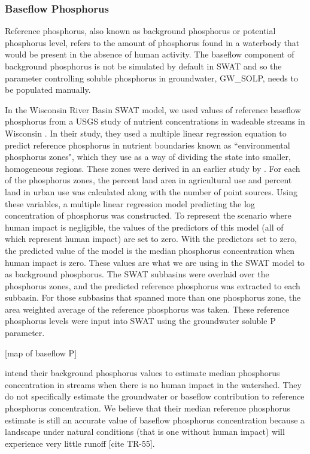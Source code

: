 \subsubsection{Baseflow Phosphorus}
	Reference phosphorus, also known as background phosphorus or potential phosphorus level, refers to the amount of phosphorus found in a waterbody that would be present in the absence of human activity. The baseflow component of background phosphorus is not be simulated by default in SWAT and so the parameter controlling soluble phosphorus in groundwater, GW\_SOLP, needs to be populated manually. 
	
	In the Wisconsin River Basin SWAT model, we used values of reference baseflow phosphorus from a USGS study of nutrient concentrations in wadeable streams in Wisconsin \citet{robertson_wadeable_2006}. In their study, they used a multiple linear regression equation to predict reference phosphorus in nutrient boundaries known as ``environmental phosphorus zones", which they use as a way of dividing the state into smaller, homogeneous regions. These zones were derived in an earlier study by \citet{robertson_phosphoruszones_2006}. 
	For each of the phosphorus zones, the percent land area in agricultural use and percent land in urban use was calculated along with the number of point sources. Using these variables, a multiple linear regression model predicting the log concentration of phosphorus was constructed. To represent the scenario where human impact is negligible, the values of the predictors of this model (all of which represent human impact) are set to zero. With the predictors set to zero, the predicted value of the model is the median phosphorus concentration when human impact is zero.	These values are what we are using in the SWAT model to as background phosphorus. The SWAT subbasins were overlaid over the phosphorus zones, and the predicted reference phosphorus was extracted to each subbasin. For those subbasins that spanned more than one phosphorus zone, the area weighted average of the reference phosphorus was taken. These reference phosphorus levels were input into SWAT using the groundwater soluble P parameter.
	
	[map of baseflow P]
	
	\citet{robertson_wadeable_2006} intend their background phosphorus values to estimate median phosphorus concentration in streams when there is no human impact in the watershed. They do not specifically estimate the groundwater or baseflow contribution to reference phosphorus concentration. We believe that their median reference phosphorus estimate is still an accurate value of baseflow phosphorus concentration because a landscape under natural conditions (that is one without human impact) will experience very little runoff [cite TR-55].
	
	
	
	